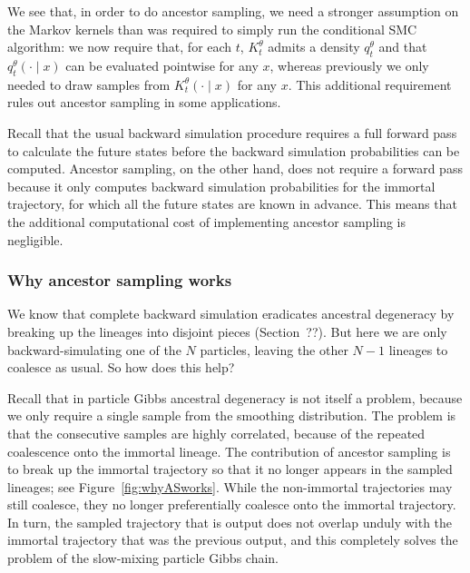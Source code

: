 We see that, in order to do ancestor sampling, we need a stronger assumption on the Markov kernels than was required to simply run the conditional SMC algorithm: we now require that, for each $t$, $K_t^\theta$ admits a density $q_t^\theta$ and that $q_t^\theta(\cdot \mid x)$ can be evaluated pointwise for any $x$, whereas previously we only needed to draw samples from $K_t^\theta(\cdot\mid x)$ for any $x$.
This additional requirement rules out ancestor sampling in some applications.

Recall that the usual backward simulation procedure requires a full forward pass to calculate the future states before the backward simulation probabilities can be computed. Ancestor sampling, on the other hand, does not require a forward pass because it only computes backward simulation probabilities for the immortal trajectory, for which all the future states are known in advance. This means that the additional computational cost of implementing ancestor sampling is negligible.




\subsubsection{Why ancestor sampling works}
We know that complete backward simulation eradicates ancestral degeneracy by breaking up the lineages into disjoint pieces (Section~??).
But here we are only backward-simulating one of the $N$ particles, leaving the other $N-1$ lineages to coalesce as usual. So how does this help?

Recall that in particle Gibbs ancestral degeneracy is not itself a problem, because we only require a single sample from the smoothing distribution. 
The problem is that the consecutive samples are highly correlated, because of  the repeated coalescence onto the immortal lineage.
The contribution of ancestor sampling is to break up the immortal trajectory so that it no longer appears in the sampled lineages; see Figure~\ref{fig:whyASworks}. While the non-immortal trajectories may still coalesce, they no longer preferentially coalesce onto the immortal trajectory. 
In turn, the sampled trajectory that is output does not overlap unduly with the immortal trajectory that was the previous output, and this completely solves the problem of the slow-mixing particle Gibbs chain.

